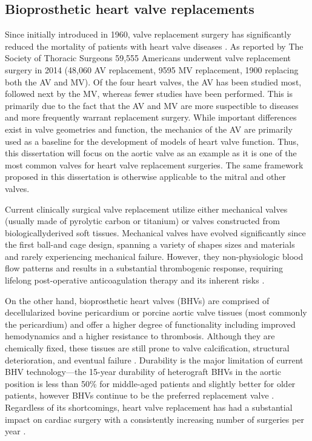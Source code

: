 \subsection{Bioprosthetic heart valve replacements}
     
    Since initially introduced in 1960, valve replacement surgery has significantly reduced the mortality of patients with heart valve diseases \cite{braunwald_complete_1960,pibarot_valvular_2009,ross_replacement_1967}. As reported by The Society of Thoracic Surgeons 59,555 Americans underwent valve replacement surgery in 2014 (48,060 AV replacement, 9595 MV replacement, 1900 replacing both the AV and MV).  Of the four heart valves, the AV has been studied most, followed next by the MV, whereas fewer studies have been performed. This is primarily due to the fact that the AV \cite{christie_age_1995,merryman_correlation_2006,adamczyk_characteristics_2002,sacks_aortic_1998,billiar_biaxial_2000,billiar_biaxial_2000b,vesely_comparison_1998,vesely_micromechanics_1992,vesely_role_1998} and MV \cite{stella_biaxial_2007,sacks_surface_2002,gorman_dynamic_1996,gorman_effect_2004} are more suspectible to diseases and more frequently warrant replacement surgery. While important differences exist in valve geometries and function, the mechanics of the AV are primarily used as a baseline for the development of models of heart valve function. Thus, this dissertation will focus on the aortic valve as an example as it is one of the most common valves for heart valve replacement surgeries. The same framework proposed in this dissertation is otherwise applicable to the mitral and other valves. 
    
    
    Current clinically surgical valve replacement utilize either mechanical valves (usually made of pyrolytic carbon or titanium) or valves constructed from biologically\Hyphdash derived soft tissues.  Mechanical valves have evolved significantly since the first ball-and cage design, spanning a variety of shapes sizes and materials and rarely experiencing mechanical failure. However, they non-physiologic blood flow patterns and results in a substantial thrombogenic response, requiring lifelong post-operative anticoagulation therapy and its inherent risks \cite{pibarot_valvular_2009}.
    
    
    On the other hand, bioprosthetic heart valves (BHVs) are comprised of decellularized bovine pericardium or porcine aortic valve tissues (most commonly the pericardium) and offer a higher degree of functionality including improved hemodynamics and a higher resistance to thrombosis. Although they are chemically fixed, these tissues are still prone to valve calcification, structural deterioration, and eventual failure \cite{sacks_collagen_2002,vyavahare_mechanisms_1999}. Durability is the major limitation of current BHV technology—the 15-year durability of heterograft BHVs in the aortic position is less than 50\% for middle-aged patients and slightly better for older patients, however BHVs continue to be the preferred replacement valve \cite{siddiqui_bioprosthetic_2009}. Regardless of its shortcomings, heart valve replacement has had a substantial impact on cardiac surgery with a consistently increasing number of surgeries per year \cite{starr_artificial_2007}.

